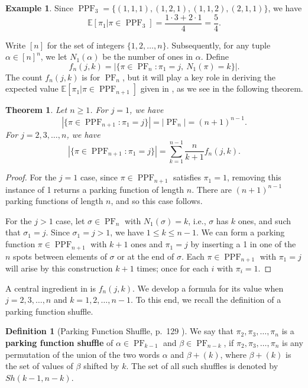 \documentclass[12pt,reqno]{amsart}
\newtheorem{theorem}{Theorem}[section]
\theoremstyle{definition}
\newtheorem{definition}{Definition}
\newtheorem{example}{Example}
\newcommand{\E}{\mathbb{E}}
\theoremstyle{remark}
\DeclareMathOperator{\PF}{PF}
\DeclareMathOperator{\PPF}{PPF}
\newcommand{\defterm}{\textbf}
\begin{document}
\begin{example} 
Since  $\PPF_3=\{(1,1,1),(1,2,1),(1,1,2),(2,1,1)\}$, we have
    \[\E [\pi_1 | \pi \in \PPF_{3}]=\frac{1\cdot 3+2\cdot 1}{4}=\frac{5}{4}.\]
\end{example}

Write $[n]$ for the set of integers $\{1,2, \dots, n\}$. Subsequently, for any tuple $\alpha\in[n]^n$, we let $N_1(\alpha)$ be the number of ones in $\alpha$. 
Define \[f_{n}(j,k)=|\{\pi\in\PF_n:\pi_1=j, \ N_1(\pi)=k\}|.\]
The count $f_n(j,k)$ is for $\PF_n$, but it will play a key role in deriving the expected value $\E[\pi_1 | \pi \in \PPF_{n+1}]$ given in , as we see in the following theorem.


\begin{theorem}
\label{thm:related to fnjk}
Let $n\geq 1$. 
For $j=1$, we have
\[|\{\pi\in\PPF_{n+1}:\pi_1=j\}|=|\PF_{n}|=(n+1)^{n-1}.\]
For $j=2,3,\ldots, n$, we have 
    \[|\{\pi\in\PPF_{n+1}:\pi_1=j\}|=\sum_{k=1}^{n-1}\frac{n}{k+1}f_{n}(j,k).\]
\end{theorem}
\begin{proof}
For the $j=1$ case,  since $\pi\in\PPF_{n+1}$ satisfies $\pi_1=1$, removing this instance of 1 returns a parking function of length $n$.  There are $(n+1)^{n-1}$ parking functions of length $n$, and so this case follows.

 For the $j>1$ case, let $\sigma \in \PF_n$ with $N_1(\sigma)=k$, i.e., $\sigma$ has $k$ ones, and such that $\sigma_1=j$. Since $\sigma_1=j>1$, we have $1\leq k\leq n-1$. We can form a parking function $\pi \in \PPF_{n+1}$ with $k+1$ ones and $\pi_1=j$ by inserting a 1 in one of the $n$ spots between elements of $\sigma$ or at the end of $\sigma$. Each $\pi \in \PPF_{n+1}$ with $\pi_1=j$ will arise by this construction $k+1$ times; once for each $i$ with $\pi_i=1$. 
\end{proof}



A central ingredient in  is $f_n(j, k)$. We develop a formula for its value when $j=2,3,\ldots,n$ and $k=1,2,\ldots,n-1$. To this end, we recall the definition of a parking function shuffle. 

\begin{definition}[Parking Function Shuffle, p.~129 \cite{diaconis2017probabilizing}]
We say that $\pi_2,\pi_3,\ldots,\pi_n$ is a \defterm{parking function shuffle} of $\alpha\in\PF_{k-1}$ and $\beta\in \PF_{n-k}$, if $\pi_2,\pi_3,\ldots,\pi_n$ is any permutation of the union of the two words $\alpha$ and $\beta+(k)$, where $\beta+(k)$ is the set of values of $\beta$ shifted by $k$. The set of all such shuffles is denoted by $Sh(k-1,n-k)$.
\end{definition}
\end{document}
